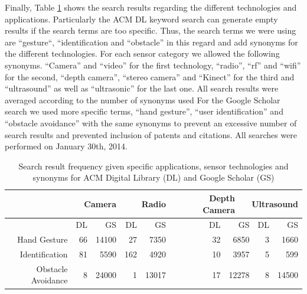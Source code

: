 Finally, Table \ref{tab:bench_search_res} shows the search results regarding the different technologies and applications. Particularly the ACM DL keyword search can generate empty results if the search terms are too specific. Thus, the search terms we were using are “gesture“, “identification and “obstacle” in this regard and add synonyms for the different technologies. For each sensor category we allowed the following synonyms. “Camera” and “video” for the first technology, “radio”, “rf” and “wifi” for the second, “depth camera”, “stereo camera” and “Kinect” for the third and “ultrasound” as well as “ultrasonic” for the last one. All search results were averaged according to the number of synonyms used For the Google Scholar search we used more specific terms, “hand gesture”, “user identification” and “obstacle avoidance” with the same synonyms to prevent an excessive number of search results and prevented inclusion of patents and citations. All searches were performed on January 30th, 2014.
\begin{table}[htbp]
  \centering
  \caption{Search result frequency given specific applications, sensor technologies and synonyms for ACM Digital Library (DL) and Google Scholar (GS)}
    \begin{tabular}{rrrrrrrrrr}
    \toprule
          & \multicolumn{2}{r}{Camera} & \multicolumn{2}{r}{Radio} & \multicolumn{2}{r}{Depth Camera} & \multicolumn{3}{r}{Ultrasound} \\
    \midrule
          & DL    & GS    & DL    & GS    & DL    & \multicolumn{2}{r}{GS} & DL    & GS \\
    Hand Gesture & 66    & 14100 & 27    & 7350  & 32    & \multicolumn{2}{r}{6850} & 3     & 1660 \\
    Identification & 81    & 5590  & 162   & 4920  & 10    & \multicolumn{2}{r}{3957} & 5     & 599 \\
    Obstacle Avoidance & 8     & 24000 & 1     & 13017 & 17    & \multicolumn{2}{r}{12278} & 8     & 14500 \\
    \bottomrule
    \end{tabular}%
  \label{tab:bench_search_res}%
\end{table}%

